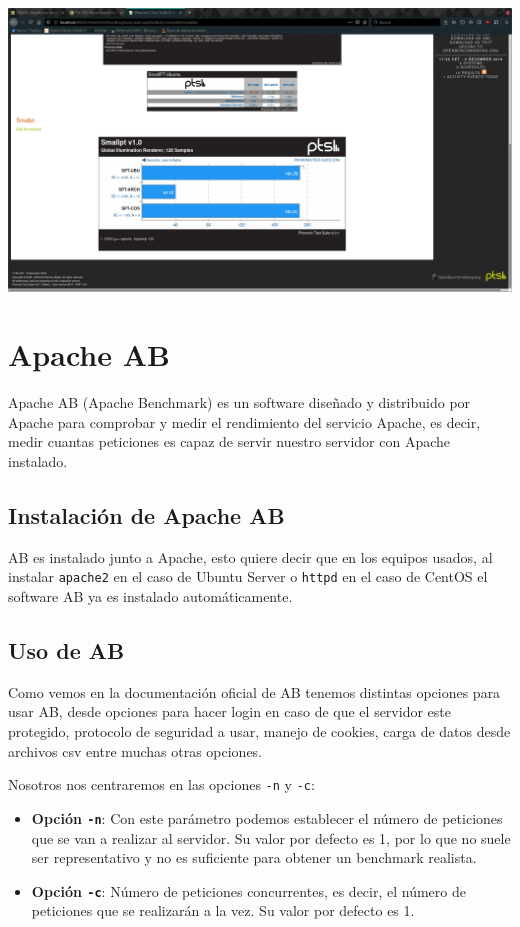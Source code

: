 \documentclass[12pt, spanish]{article}
\begin{document}
\begin{center}
\includegraphics[scale=0.25]{phoromatic_graph.png}
\end{center}

\section{Apache AB}

Apache AB (Apache Benchmark) es un software diseñado y distribuido por Apache para comprobar y medir el rendimiento del servicio Apache, es decir, medir cuantas peticiones es capaz de servir nuestro servidor con Apache instalado. 

\subsection{Instalación de Apache AB}

AB es instalado junto a Apache, esto quiere decir que en los equipos usados, al instalar \texttt{apache2} en el caso de Ubuntu Server o \texttt{httpd} en el caso de CentOS el software AB ya es instalado automáticamente.

\subsection{Uso de AB}

Como vemos en la documentación oficial de AB\cite{ab_doc} tenemos distintas opciones para usar AB, desde opciones para hacer login en caso de que el servidor este protegido, protocolo de seguridad a usar, manejo de cookies, carga de datos desde archivos csv entre muchas otras opciones.

Nosotros nos centraremos en las opciones \texttt{-n} y  \texttt{-c}:

\begin{itemize}
	\item \textbf{Opción \texttt{-n}}: Con este parámetro podemos establecer el número de peticiones que se van a realizar al servidor. Su valor por defecto es 1, por lo que no suele ser representativo y no es suficiente para obtener un benchmark realista.
	
	\item \textbf{Opción \texttt{-c}}: Número de peticiones concurrentes, es decir, el número de peticiones que se realizarán a la vez. Su valor por defecto es 1.
\end{itemize}
\end{document}
